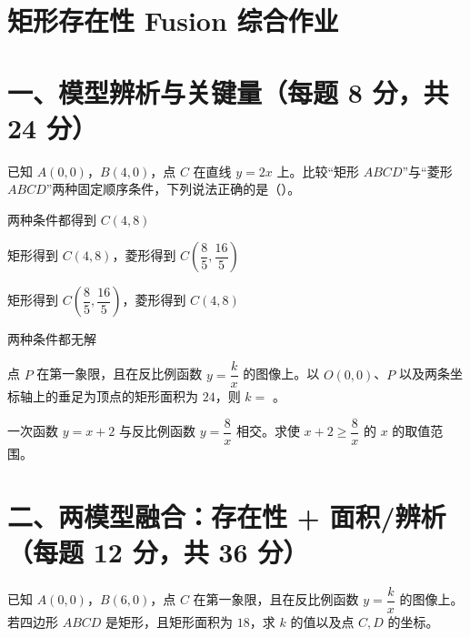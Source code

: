 \documentclass{exam-zh}
\newcommand{\answerarea}[1][40mm]{%
  \vspace{2mm}%
  \begin{tcolorbox}[
    enhanced, breakable,
    colback=white,
    colframe=white,
    boxrule=0pt,
    height=#1,
    valign=top,
    bottom=0mm,
    after skip=0mm,
  ]
  \end{tcolorbox}%
}
\begin{document}
\section*{矩形存在性 Fusion 综合作业}

\section*{一、模型辨析与关键量（每题 8 分，共 24 分）}


\begin{question}[points=8]
  已知 $A(0,0)$，$B(4,0)$，点 $C$ 在直线 $y=2x$ 上。比较“矩形 $ABCD$”与“菱形 $ABCD$”两种固定顺序条件，下列说法正确的是（\quad）。

  \begin{choices}
    \item 两种条件都得到 $C(4,8)$
    \item 矩形得到 $C(4,8)$，菱形得到 $C\left(\dfrac85,\dfrac{16}{5}\right)$
    \item 矩形得到 $C\left(\dfrac85,\dfrac{16}{5}\right)$，菱形得到 $C(4,8)$
    \item 两种条件都无解
  \end{choices}
\end{question}



\begin{question}[points=8]
  点 $P$ 在第一象限，且在反比例函数 $y=\dfrac{k}{x}$ 的图像上。以 $O(0,0)$、$P$ 以及两条坐标轴上的垂足为顶点的矩形面积为 $24$，则 $k=$ \underline{\hspace{2cm}}。

\end{question}



\begin{problem}[points=8]
  一次函数 $y=x+2$ 与反比例函数 $y=\dfrac{8}{x}$ 相交。求使 $x+2\ge \dfrac{8}{x}$ 的 $x$ 的取值范围。

  \answerarea[28mm]
\end{problem}


\section*{二、两模型融合：存在性 + 面积/辨析（每题 12 分，共 36 分）}


\begin{problem}[points=12]
  已知 $A(0,0)$，$B(6,0)$，点 $C$ 在第一象限，且在反比例函数 $y=\dfrac{k}{x}$ 的图像上。若四边形 $ABCD$ 是矩形，且矩形面积为 $18$，求 $k$ 的值以及点 $C,D$ 的坐标。

  \answerarea[48mm]
\end{problem}
\end{document}
